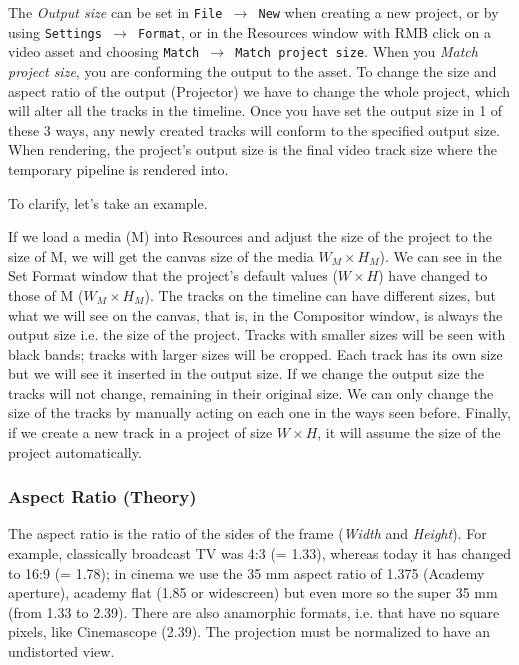The \textit{Output size} can be set in \texttt{File $\rightarrow$ New} when creating a new project,
or by using \texttt{Settings $\rightarrow$ Format}, or in the Resources window with RMB click on
a video asset and choosing \texttt{Match $\rightarrow$ Match project size}. When you \emph{Match project size}, you
are conforming the output to the asset. To change the size and aspect ratio of the output (Projector) we have to change the whole project, which will alter all the tracks in the timeline. Once you have set the output size in 1 of these 3 ways,
any newly created tracks will conform to the specified output size.  When rendering, the project's
output size is the final video track size where the temporary pipeline is rendered into.

To clarify, let's take an example.

If we load a media (M) into Resources and adjust the size of the project to the size of M, we will get the canvas size of the media $W_{M} \times H_{M}$). We can see in the Set Format window that the project's default values ($W \times H$) have changed to those of M ($W_{M} \times H_{M}$). The tracks on the timeline can have different sizes, but what we will see on the canvas, that is, in the Compositor window, is always the output size i.e. the size of the project. Tracks with smaller sizes will be seen with black bands; tracks with larger sizes will be cropped. Each track has its own size but we will see it inserted in the output size. If we change the output size the tracks will not change, remaining in their original size. We can only change the size of the tracks by manually acting on each one in the ways seen before. Finally, if we create a new track in a project of size $W \times H$, it will assume the size of the project automatically.

\subsubsection*{Aspect Ratio (Theory)}%
\label{ssub:aspect_ratio_theory}

The aspect ratio is the ratio of the sides of the frame (\textit{Width} and \textit{Height}). For example, classically broadcast TV was 4:3 (= 1.33), whereas today it has changed to 16:9 (= 1.78); in cinema we use the 35 mm aspect ratio of 1.375 (Academy aperture), academy flat (1.85 or widescreen) but even more so the super 35 mm (from 1.33 to 2.39). There are also anamorphic formats, i.e. that have no square pixels, like Cinemascope (2.39). The projection must be normalized to have an undistorted view.

